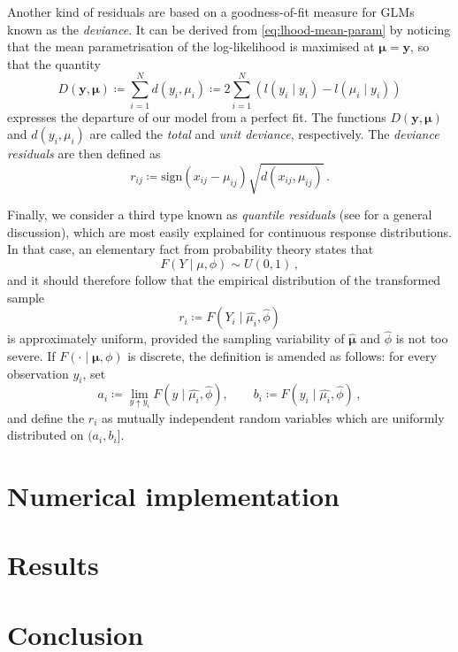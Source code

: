 \documentclass[a4paper]{book}
\begin{document}
Another kind of residuals are based on a goodness-of-fit measure for GLMs known as the \emph{deviance}. It can be derived from \cref{eq:lhood-mean-param} by noticing that the mean parametrisation of the log-likelihood is maximised at $\bm{\mu} = \mathbf{y}$, so that the quantity
\begin{equation}
  D(\mathbf{y}, \bm{\mu}) \coloneqq \sum_{i = 1}^N d(y_i, \mu_i) \coloneqq 2 \sum_{i = 1}^N (l(y_i \mid y_i) - l(\widehat{\mu}_i \mid y_i)) 
\end{equation}
expresses the departure of our model from a perfect fit. The functions $D(\mathbf{y}, \bm{\mu})$ and $d(y_i, \mu_i)$ are called the \emph{total} and \emph{unit deviance}, respectively. The \emph{deviance residuals} are then defined as
\begin{equation}
  r_{ij} \coloneqq \mathrm{sign}(x_{ij} - \mu_{ij}) \sqrt{d(x_{ij}, \mu_{ij})} \,.
\end{equation}

Finally, we consider a third type known as \emph{quantile residuals} (see \cite{dunn} for a general discussion), which are most easily explained for continuous response distributions. In that case, an elementary fact from probability theory states that
\begin{equation}
  F(Y \mid \mu, \phi) \sim U(0, 1) \,,
\end{equation}
and it should therefore follow that the empirical distribution of the transformed sample
\begin{equation}
  r_i \coloneqq F(Y_i \mid \widehat{\mu_i}, \widehat{\phi})
\end{equation}
is approximately uniform, provided the sampling variability of $\bm{\widehat{\mu}}$ and $\widehat{\phi}$ is not too severe. If $F(\cdot \mid \bm{\mu}, \phi)$ is discrete, the definition is amended as follows: for every observation $y_i$, set
\begin{equation}
  a_i \coloneqq \lim_{y \uparrow y_i} F(y \mid \widehat{\mu_i}, \widehat{\phi}), \qquad b_i \coloneqq F(y_i \mid \widehat{\mu_i}, \widehat{\phi}) \,,
\end{equation}
and define the $r_i$ as mutually independent random variables which are uniformly distributed on $(a_i, b_i]$.

\chapter{Numerical implementation}

\chapter{Results}


\backmatter%
\chapter{Conclusion}

\printbibliography%
\end{document}
